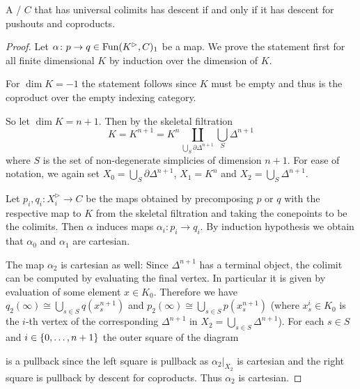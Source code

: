\begin{lemma}\label{lem:descentIffDescentPoAndCoprod}
    A \inftycat/ $C$ that has universal colimits has descent if and only if it has descent for pushouts and coproducts.
    \begin{proof} %
        Let $\alpha\colon p\to q\in\operatorname{Fun}(K^{\rhd},C)_1$ be a map.
        We prove the statement first for all finite dimensional $K$ by induction over the dimension of $K$. %

        For $\dim K=-1$ the statement follows since $K$ must be empty and thus is the coproduct over the empty indexing category.

        So let $\dim K=n+1$.
        Then by the skeletal filtration        
        \begin{equation*}
            K=K^{n+1}=K^n\coprod\limits_{\bigcup\limits_S \partial\Delta^{n+1}}\bigcup_S \Delta^{n+1}
        \end{equation*}
        where $S$ is the set of non-degenerate simplicies of dimension $n+1$.
        For ease of notation, we again set $X_{0}=\bigcup\limits_S \partial\Delta^{n+1}$, $X_1=K^n$ and $X_2=\bigcup\limits_S \Delta^{n+1}$.
        
        Let $p_i,q_i\colon X_i^{\rhd}\to C$ be the maps obtained by precomposing $p$ or $q$ with the respective map to $K$ from the skeletal filtration and taking the conepoints to be the colimits.
        Then $\alpha$ induces maps $\alpha_i\colon p_i\to q_i$. %
        By induction hypothesis we obtain that $\alpha_0$ and $\alpha_1$ are cartesian.

        The map $\alpha_2$ is cartesian as well: 
        Since $\Delta^{n+1}$ has a terminal object, the colimit can be computed by evaluating the final vertex. 
        In particular it is given by evaluation of some element $x\in K_0$.
        Therefore we have $q_2(\infty)\cong\bigcup\limits_{s\in S} q(x_s^{n+1})$ and $p_2(\infty)\cong\bigcup\limits_{s\in S} p(x_s^{n+1})$ (where $x_s^i\in K_0$ is the $i$-th vertex of the corresponding $\Delta^{n+1}$ in $X_2=\bigcup\limits_{s\in S} \Delta^{n+1}$).
        For each $s\in S$ and $i\in\left\lbrace0,\ldots,n+1\right\rbrace$ the outer square of the diagram
        \begin{center}
        \end{center}
        is a pullback since the left square is pullback as $\alpha_2|_{X_2}$ is cartesian and the right square is pullback by descent for coproducts.
        Thus $\alpha_2$ is cartesian.


\end{proof}
\end{lemma}
